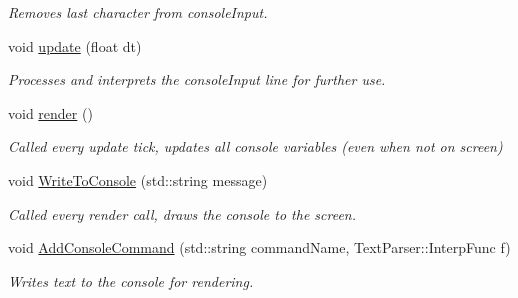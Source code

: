 \begin{DoxyCompactItemize}
\begin{DoxyCompactList}\small\item\em Removes last character from console\+Input. \end{DoxyCompactList}\item 
\hypertarget{class_debug_helper_a8ef4429ee0c1146b563c53d4a4b44ca8}{void \hyperlink{class_debug_helper_a8ef4429ee0c1146b563c53d4a4b44ca8}{update} (float dt)}\label{class_debug_helper_a8ef4429ee0c1146b563c53d4a4b44ca8}

\begin{DoxyCompactList}\small\item\em Processes and interprets the console\+Input line for further use. \end{DoxyCompactList}\item 
\hypertarget{class_debug_helper_a2af378fe6006f6024d5486d8090732aa}{void \hyperlink{class_debug_helper_a2af378fe6006f6024d5486d8090732aa}{render} ()}\label{class_debug_helper_a2af378fe6006f6024d5486d8090732aa}

\begin{DoxyCompactList}\small\item\em Called every update tick, updates all console variables (even when not on screen) \end{DoxyCompactList}\item 
\hypertarget{class_debug_helper_a44cff1d53586f120fcab4b8e3e84e438}{void \hyperlink{class_debug_helper_a44cff1d53586f120fcab4b8e3e84e438}{Write\+To\+Console} (std\+::string message)}\label{class_debug_helper_a44cff1d53586f120fcab4b8e3e84e438}

\begin{DoxyCompactList}\small\item\em Called every render call, draws the console to the screen. \end{DoxyCompactList}\item 
\hypertarget{class_debug_helper_a0395140c6b19bba0c8e10809b22a136f}{void \hyperlink{class_debug_helper_a0395140c6b19bba0c8e10809b22a136f}{Add\+Console\+Command} (std\+::string command\+Name, Text\+Parser\+::\+Interp\+Func f)}\label{class_debug_helper_a0395140c6b19bba0c8e10809b22a136f}

\begin{DoxyCompactList}\small\item\em Writes text to the console for rendering. \end{DoxyCompactList}\end{DoxyCompactItemize}
